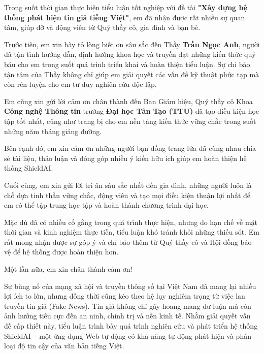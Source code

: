 \documentclass[12pt,a4paper]{article}
\begin{document}
\begin{center}\vspace*{2.4cm}{\bfseries\Large LỜI CẢM ƠN}\end{center}
\vspace{0.5cm}
Trong suốt thời gian thực hiện tiểu luận tốt nghiệp với đề tài \textbf{"Xây dựng hệ thống phát hiện tin giả tiếng Việt"}, em đã nhận được rất nhiều sự quan tâm, giúp đỡ và động viên từ Quý thầy cô, gia đình và bạn bè.

Trước tiên, em xin bày tỏ lòng biết ơn sâu sắc đến Thầy \textbf{Trần Ngọc Anh}, người đã tận tình hướng dẫn, định hướng khoa học và truyền đạt những kiến thức quý báu cho em trong suốt quá trình triển khai và hoàn thiện tiểu luận. Sự chỉ bảo tận tâm của Thầy không chỉ giúp em giải quyết các vấn đề kỹ thuật phức tạp mà còn rèn luyện cho em tư duy nghiên cứu độc lập.

Em cũng xin gửi lời cảm ơn chân thành đến Ban Giám hiệu, Quý thầy cô Khoa \textbf{Công nghệ Thông tin} trường \textbf{Đại học Tân Tạo (TTU)} đã tạo điều kiện học tập tốt nhất, cũng như trang bị cho em nền tảng kiến thức vững chắc trong suốt những năm tháng giảng đường.

Bên cạnh đó, em xin cảm ơn những người bạn đồng trang lứa đã cùng nhau chia sẻ tài liệu, thảo luận và đóng góp nhiều ý kiến hữu ích giúp em hoàn thiện hệ thống ShieldAI.

Cuối cùng, em xin gửi lời tri ân sâu sắc nhất đến gia đình, những người luôn là chỗ dựa tinh thần vững chắc, động viên và tạo mọi điều kiện thuận lợi nhất để em có thể tập trung học tập và hoàn thành chương trình đại học.

Mặc dù đã có nhiều cố gắng trong quá trình thực hiện, nhưng do hạn chế về mặt thời gian và kinh nghiệm thực tiễn, tiểu luận khó tránh khỏi những thiếu sót. Em rất mong nhận được sự góp ý và chỉ bảo thêm từ Quý thầy cô và Hội đồng bảo vệ để hệ thống được hoàn thiện hơn.

Một lần nữa, em xin chân thành cảm ơn!
\newpage

\begin{center}\vspace*{2.4cm}{\bfseries\Large TÓM TẮT TIỂU LUẬN}\end{center}
\vspace{0.5cm}
Sự bùng nổ của mạng xã hội và truyền thông số tại Việt Nam đã mang lại nhiều lợi ích to lớn, nhưng đồng thời cũng kéo theo hệ lụy nghiêm trọng từ việc lan truyền tin giả (Fake News). Tin giả không chỉ gây hoang mang dư luận mà còn ảnh hưởng tiêu cực đến an ninh, chính trị và nền kinh tế. Nhằm giải quyết vấn đề cấp thiết này, tiểu luận trình bày quá trình nghiên cứu và phát triển hệ thống ShieldAI – một ứng dụng Web tự động có khả năng tự động phát hiện và phân loại độ tin cậy của văn bản tiếng Việt.
\end{document}
